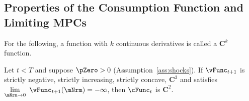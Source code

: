 \documentclass[\econtexRoot/BufferStockTheory]{subfiles}
\begin{document}
\subsection{Properties of the Consumption Function and Limiting MPCs}\label{sec:MPCiterproofs}

For the following, a function with $k$ continuous derivatives is called a $\mathbf{C}^{k}$ function.


\begin{lemma}\label{lemm:consC2}
Let $t<T$ and suppose $\pZero>0$ (Assumption~\ref{ass:shocks}).
If $\vFunc_{t+1}$ is strictly negative, strictly increasing, strictly concave, $\mathbf{C}^{3}$ and satisfies $\lim\limits_{\mNrm\rightarrow 0}~\vFunc_{t+1}(\mNrm) =-\infty $, then $\cFunc_{t}$ is $\mathbf{C}^{2}$.
\end{lemma}

\end{document}
